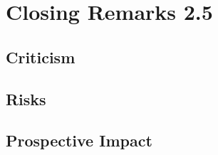 \chapter{Closing Remarks 2.5}
\label{cha:ClosingRemarks}

\section{Criticism}
\section{Risks}
\section{Prospective Impact}